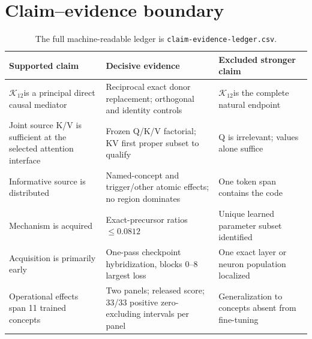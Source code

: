 \documentclass[10pt,twocolumn]{article}
\newcommand{\K}{\ensuremath{\mathcal{K}_{12}}}
\newcommand{\code}[1]{\texttt{#1}}
\begin{document}
\section{Claim--evidence boundary}

\begin{table}[ht]
\centering
\small
\begin{tabularx}{\textwidth}{p{}X p{}}
\toprule
Supported claim & Decisive evidence & Excluded stronger claim \\
\midrule
\K is a principal direct causal mediator & Reciprocal exact donor replacement; orthogonal and identity controls & \K is the complete natural endpoint \\
Joint source K/V is sufficient at the selected attention interface & Frozen Q/K/V factorial; KV first proper subset to qualify & Q is irrelevant; values alone suffice \\
Informative source is distributed & Named-concept and trigger/other atomic effects; no region dominates & One token span contains the code \\
Mechanism is acquired & Exact-precursor ratios $\leq0.0812$ & Unique learned parameter subset identified \\
Acquisition is primarily early & One-pass checkpoint hybridization, blocks 0--8 largest loss & One exact layer or neuron population localized \\
Operational effects span 11 trained concepts & Two panels; released score; 33/33 positive zero-excluding intervals per panel & Generalization to concepts absent from fine-tuning \\
\bottomrule
\end{tabularx}
\caption{The full machine-readable ledger is \code{claim-evidence-ledger.csv}.}
\end{table}
\end{document}
